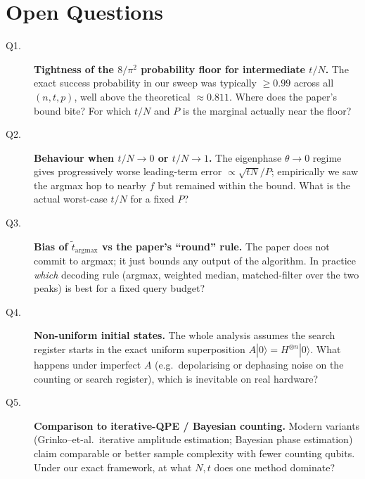 \documentclass[11pt]{article}
\begin{document}
\section{Open Questions}
\begin{description}
  \item[Q1.] \textbf{Tightness of the $8/\pi^2$ probability floor for
    intermediate $t/N$.} The exact success probability in our sweep was
    typically $\ge 0.99$ across all $(n,t,p)$, well above the theoretical
    $\approx 0.811$. Where does the paper's bound bite? For which $t/N$ and $P$
    is the marginal actually near the floor?
  \item[Q2.] \textbf{Behaviour when $t/N \to 0$ or $t/N \to 1$.} The eigenphase
    $\theta \to 0$ regime gives progressively worse leading-term error
    $\propto\sqrt{tN}/P$; empirically we saw the argmax hop to nearby $f$ but
    remained within the bound. What is the actual worst-case
    $t/N$ for a fixed $P$?
  \item[Q3.] \textbf{Bias of $\tilde t_{\mathrm{argmax}}$ vs the paper's
    ``round'' rule.} The paper does not commit to argmax; it just bounds any
    output of the algorithm. In practice \emph{which} decoding rule (argmax,
    weighted median, matched-filter over the two peaks) is best for a fixed
    query budget?
  \item[Q4.] \textbf{Non-uniform initial states.} The whole analysis assumes
    the search register starts in the exact uniform superposition $A|0\rangle =
    H^{\otimes n}|0\rangle$. What happens under imperfect $A$ (e.g.\
    depolarising or dephasing noise on the counting or search register), which
    is inevitable on real hardware?
  \item[Q5.] \textbf{Comparison to iterative-QPE / Bayesian counting.} Modern
    variants (Grinko--et-al.\ iterative amplitude estimation; Bayesian phase
    estimation) claim comparable or better sample complexity with fewer
    counting qubits. Under our exact framework, at what $N,t$ does one method
    dominate?
\end{description}
\end{document}
